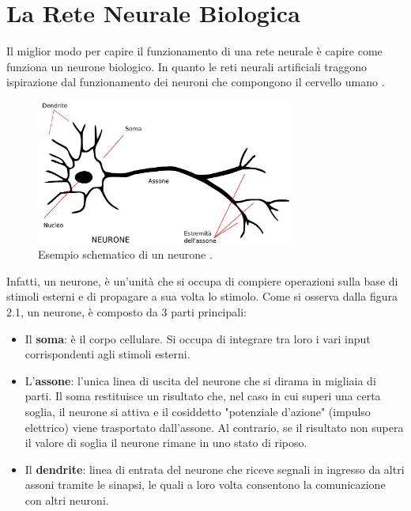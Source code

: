 \section{La Rete Neurale Biologica}
Il miglior modo per capire il funzionamento di una rete neurale è capire come 
funziona un neurone biologico. In quanto le reti neurali artificiali traggono 
ispirazione dal funzionamento dei neuroni che compongono il cervello umano 
\cite{PARAGONE_CERVELLE_RETE_NEURALE_1, PARAGONE_CERVELLE_RETE_NEURALE_2}.

\begin{figure}[h]
    \centering
    \includegraphics[width=0.75\textwidth]{Immagini/Generiche/Neurone.png}
    \caption{Esempio schematico di un neurone \cite{NEURONE_BIOLOGICO}.}
    \label{fig:esempioNeurone}
\end{figure}

Infatti, un neurone, è un’unità che si occupa di compiere operazioni sulla base di
stimoli esterni e di propagare a sua volta lo stimolo.
Come si osserva dalla figura 2.1, un neurone, è composto da 3 parti principali:

\begin{itemize}
    \item  Il \textbf{soma}:  è il corpo cellulare. Si occupa di integrare tra loro i vari input
    corrispondenti agli stimoli esterni.

    \item L'\textbf{assone}:  l’unica linea di uscita del neurone che si dirama in migliaia di
    parti. Il soma restituisce un risultato che, nel caso in cui superi una certa
    soglia, il neurone si attiva e il cosiddetto "potenziale d’azione" (impulso
    elettrico) viene trasportato dall’assone. Al contrario, se il risultato non
    supera il valore di soglia il neurone rimane in uno stato di riposo.

    \item Il \textbf{dendrite}:  linea di entrata del neurone che riceve segnali in ingresso
    da altri assoni tramite le sinapsi, le quali a loro volta consentono la
    comunicazione con altri neuroni.
\end{itemize}

